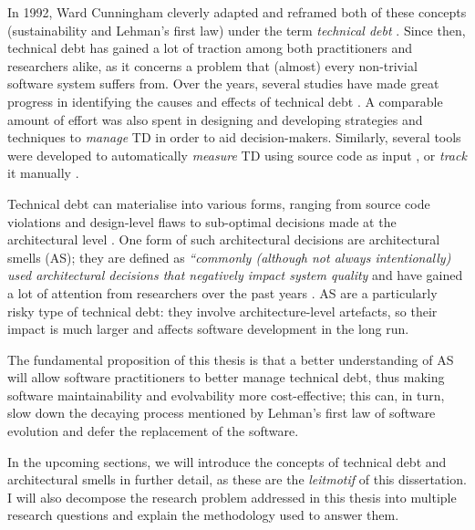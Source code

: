 In 1992, Ward Cunningham cleverly adapted and reframed both of these concepts (sustainability and Lehman's first law) under the term \emph{technical debt} \cite{Cunningham1992}. 
Since then, technical debt has gained a lot of traction among both practitioners and researchers alike, as it concerns a problem that (almost) every non-trivial software system suffers from. 
Over the years, several studies have made great progress in identifying the causes and effects of technical debt \cite{Brown2010,Kruchten2012}.
A comparable amount of effort was also spent in designing and developing strategies and techniques to \emph{manage} TD \cite{Li2015} in order to aid decision-makers. 
Similarly, several tools were developed to automatically \emph{measure} TD using source code as input \cite{Avgeriou2021}, or \emph{track} it manually \cite{Martini2016}.

Technical debt can materialise into various forms, ranging from source code violations \cite{Letouzey2012,Curtis2012} and design-level flaws \cite{Marinescu2012} to sub-optimal decisions made at the architectural level \cite{Ernst2015,Yli-Huumo2014}. One form of such architectural decisions are architectural smells (AS); they are defined as \emph{``commonly (although not always intentionally) used architectural decisions that negatively impact system quality} \cite{Garcia2009} and have gained a lot of attention from researchers over the past years \cite{Verdecchia2018}.
AS are a particularly risky type of technical debt: they involve architecture-level artefacts, so their impact is much larger and affects software development in the long run. 

The fundamental proposition of this thesis is that a better understanding of AS will allow software practitioners to better manage technical debt, thus making software maintainability and evolvability more cost-effective; this can, in turn, slow down the decaying process mentioned by Lehman's first law of software evolution and defer the replacement of the software.

In the upcoming sections, we will introduce the concepts of technical debt and architectural smells in further detail, as these are the \emph{leitmotif} of this dissertation.
I will also decompose the research problem addressed in this thesis into multiple research questions and explain the methodology used to answer them.


